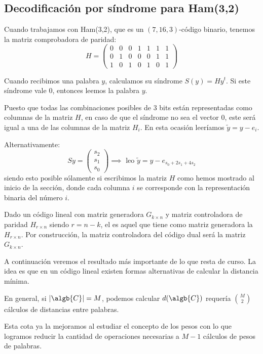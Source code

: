 \subsection{Decodificación por síndrome para Ham(3,2)}
Cuando trabajamos con Ham(3,2), que es un $(7,16,3)$-código binario, tenemos la matriz comprobadora de paridad:
\[H = \left(\begin{array}{ccccccc}
0 & 0 & 0 & 1 & 1 & 1 & 1 \\
0 & 1 & 0 & 0 & 0 & 1 & 1\\
1 & 0 & 1 & 0 & 1 & 0 & 1
\end{array}\right) \]

Cuando recibimos una palabra $y$, calculamos su síndrome $S(y)=Hy^t$. Si este síndrome vale 0, entonces leemos la palabra $y$.

Puesto que todas las combinaciones posibles de 3 bits están representadas como columnas de la matriz $H$, en caso de que el síndrome no sea el vector 0, este será igual a una de las columnas de la matriz $H_i$. En esta ocasión leeríamos $\tilde{y}=y-e_i$.

Alternativamente:
\[Sy=\left( \begin{array}{c} s_2 \\ s_1 \\ s_0 \end{array}\right) \implies \text{ leo } \tilde{y} = y-e_{s_0+2s_1+4s_2}\]
siendo esto posible sólamente si escribimos la matriz $H$ como hemos mostrado al inicio de la sección, donde cada columna $i$ se corresponde con la representación binaria del número $i$.

Dado un código lineal con matriz generadora $G_{k \times n}$ y matriz controladora de paridad $H_{r\times n}$ siendo $r=n-k$, el  es aquel que tiene como matriz generadora la $H_{r\times n}$. Por construcción, la matriz controladora del código dual será la matriz $G_{k\times n}$.

A continuación veremos el resultado más importante de lo que resta de curso. La idea es que en un código lineal existen formas alternativas de calcular la distancia mínima.

En general, si $|\algb{C}|=M$, podemos calcular $d(\algb{C})$ requería ${M \choose 2}$ cálculos de distancias entre palabras.

Esta cota ya la mejoramos al estudiar el concepto de los pesos con lo que logramos reducir la cantidad de operaciones necesarias a $M-1$ cálculos de pesos de palabras.

